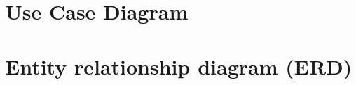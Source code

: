 \section{Use Case Diagram}\label{sec:use-case-diagram}

\section{Entity relationship diagram (ERD)}\label{sec:entity-relationship-diagram-(erd)}


